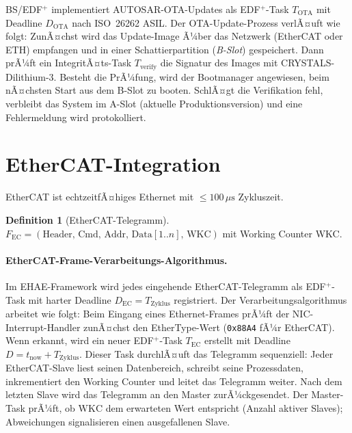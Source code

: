 ﻿\documentclass[a4paper,12pt]{scrreprt}
\theoremstyle{definition}
\newtheorem{definition}{Definition}[chapter]
\begin{document}
	BS/EDF$^+$ implementiert AUTOSAR-OTA-Updates \cite{Epp2026autsre}
	als EDF$^+$-Task $T_{\mathrm{OTA}}$ mit Deadline $D_{\mathrm{OTA}}$
	nach ISO~26262 ASIL. Der OTA-Update-Prozess verlÃ¤uft wie folgt:
	ZunÃ¤chst wird das Update-Image Ã¼ber das Netzwerk (EtherCAT oder ETH)
	empfangen und in einer Schattierpartition (\emph{B-Slot}) gespeichert.
	Dann prÃ¼ft ein IntegritÃ¤ts-Task $T_{\mathrm{verify}}$ die Signatur
	des Images mit CRYSTALS-Dilithium-3. Besteht die PrÃ¼fung, wird der
	Bootmanager angewiesen, beim nÃ¤chsten Start aus dem B-Slot zu booten.
	SchlÃ¤gt die Verifikation fehl, verbleibt das System im A-Slot (aktuelle
	Produktionsversion) und eine Fehlermeldung wird protokolliert.

	\section{EtherCAT-Integration}

	EtherCAT \cite{IEC61158,Epp2026ethercate} ist echtzeitfÃ¤higes
	Ethernet mit $\leq 100\,\mu\text{s}$ Zykluszeit.

	\begin{definition}[EtherCAT-Telegramm]
		$F_{\mathrm{EC}} = (\mathrm{Header},\, \mathrm{Cmd},\, \mathrm{Addr},\,
		\mathrm{Data}[1..n],\, \mathrm{WKC})$ mit Working Counter WKC.
	\end{definition}

	\paragraph{EtherCAT-Frame-Verarbeitungs-Algorithmus.}
	Im EHAE-Framework \cite{Epp2026ethercate} wird jedes eingehende EtherCAT-Telegramm
	als EDF$^+$-Task mit harter Deadline $D_{\mathrm{EC}} = T_{\mathrm{Zyklus}}$
	registriert. Der Verarbeitungsalgorithmus arbeitet wie folgt: Beim Eingang
	eines Ethernet-Frames prÃ¼ft der NIC-Interrupt-Handler zunÃ¤chst den
	EtherType-Wert (\texttt{0x88A4} fÃ¼r EtherCAT). Wenn erkannt, wird ein
	neuer EDF$^+$-Task $T_{\mathrm{EC}}$ erstellt mit Deadline
	$D = t_{\mathrm{now}} + T_{\mathrm{Zyklus}}$. Dieser Task durchlÃ¤uft das
	Telegramm sequenziell: Jeder EtherCAT-Slave liest seinen Datenbereich,
	schreibt seine Prozessdaten, inkrementiert den Working Counter und leitet
	das Telegramm weiter. Nach dem letzten Slave wird das Telegramm an den
	Master zurÃ¼ckgesendet. Der Master-Task prÃ¼ft, ob $\mathrm{WKC}$ dem
	erwarteten Wert entspricht (Anzahl aktiver Slaves); Abweichungen signalisieren
	einen ausgefallenen Slave.
	
\end{document}
